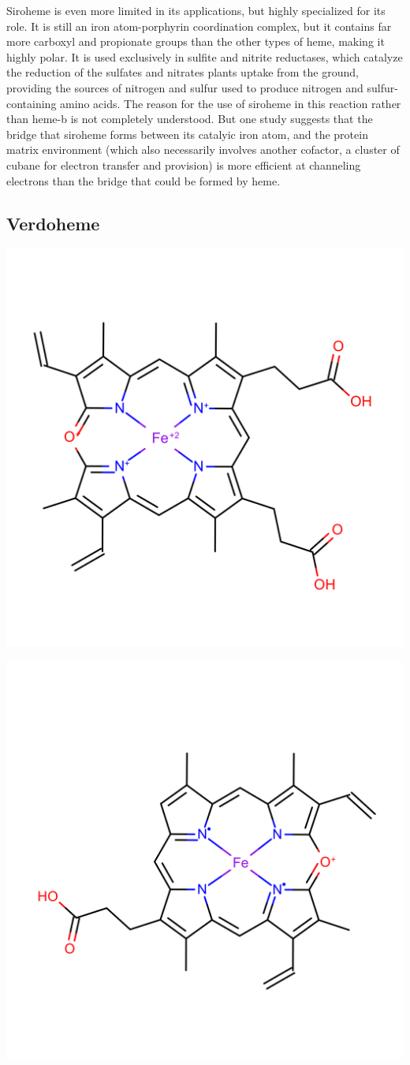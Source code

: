 \documentclass[a4paper, nobind]{templates/ociamthesis}
\let\origfigure\figure
\let\endorigfigure\endfigure
\renewenvironment{figure}[1][2] {
    \expandafter\origfigure\expandafter[H]
} {
    \endorigfigure
}
\begin{document}
Siroheme is even more limited in its applications, but highly specialized for its role. It is still an iron atom-porphyrin coordination complex, but it contains far more carboxyl and propionate groups than the other types of heme, making it highly polar. It is used exclusively in sulfite and nitrite reductases, which catalyze the reduction of the sulfates and nitrates plants uptake from the ground, providing the sources of nitrogen and sulfur used to produce nitrogen and sulfur-containing amino acids\autocite{Tripathy2010}. The reason for the use of siroheme in this reaction rather than heme-b is not completely understood. But one study suggests that the bridge that siroheme forms between its catalyic iron atom, and the protein matrix environment (which also necessarily involves another cofactor, a cluster of cubane for electron transfer and provision) is more efficient at channeling electrons than the bridge that could be formed by heme.\autocite{Branzanic2019}

\hypertarget{verdoheme}{%
\subsection{Verdoheme}\label{verdoheme}}

\begin{figure}

{\centering \includegraphics[width=0.5\linewidth]{figures/VEA} 

}

\caption{Verdoheme (VEA)}\label{fig:structVEA}
\end{figure}
\begin{figure}

{\centering \includegraphics[width=0.5\linewidth]{figures/VER} 

}

\caption{Verdoheme (VER)}\label{fig:structVER}
\end{figure}
\end{document}
